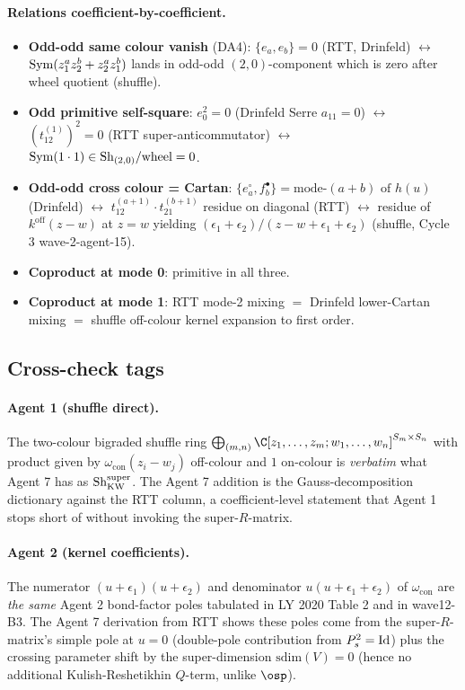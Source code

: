 \paragraph{Relations coefficient-by-coefficient.}
\begin{itemize}
  \item \textbf{Odd-odd same colour vanish} (DA4):
    $\{e_a, e_b\} = 0$ (RTT, Drinfeld) $\leftrightarrow$
    $\mathrm{Sym}(z_1^a z_2^b + z_2^a z_1^b)$ lands in odd-odd $(2,0)$-component
    which is zero after wheel quotient (shuffle).
  \item \textbf{Odd primitive self-square}:
    $e_0^2 = 0$ (Drinfeld Serre $a_{11}=0$) $\leftrightarrow$
    $(t^{(1)}_{12})^2 = 0$ (RTT super-anticommutator)
    $\leftrightarrow$ $\mathrm{Sym}(1\cdot 1) \in \mathrm{Sh}_{(2,0)}/\text{wheel} = 0$.
  \item \textbf{Odd-odd cross colour = Cartan}:
    $\{e_a^\circ, f_b^\bullet\} = \text{mode-}(a+b)\text{ of }h(u)$
    (Drinfeld) $\leftrightarrow$
    $t^{(a+1)}_{12}\cdot t^{(b+1)}_{21}$ residue on diagonal (RTT)
    $\leftrightarrow$ residue of $k^{\mathrm{off}}(z-w)$ at
    $z=w$ yielding $(\epsilon_1+\epsilon_2)/(z-w+\epsilon_1+\epsilon_2)$
    (shuffle, Cycle 3 wave-2-agent-15).
  \item \textbf{Coproduct at mode 0}: primitive in all three.
  \item \textbf{Coproduct at mode 1}: RTT mode-2 mixing
    $= $ Drinfeld lower-Cartan mixing $=$ shuffle off-colour
    kernel expansion to first order.
\end{itemize}

\subsection*{Cross-check tags}

\paragraph{Agent 1 (shuffle direct).} The two-colour bigraded shuffle
ring $\bigoplus_{(m,n)}\C[z_1,\ldots,z_m;w_1,\ldots,w_n]^{S_m\times S_n}$
with product given by $\omega_{\mathrm{con}}(z_i-w_j)$ off-colour and
$1$ on-colour is \emph{verbatim} what Agent 7 has as $\mathrm{Sh}^{\mathrm{super}}_{\mathrm{KW}}$.
The Agent 7 addition is the Gauss-decomposition dictionary against the
RTT column, a coefficient-level statement that Agent 1 stops short of
without invoking the super-$R$-matrix.

\paragraph{Agent 2 (kernel coefficients).} The numerator
$(u+\epsilon_1)(u+\epsilon_2)$ and denominator $u(u+\epsilon_1+\epsilon_2)$
of $\omega_{\mathrm{con}}$ are \emph{the same} Agent 2 bond-factor poles
tabulated in LY 2020 Table 2 and in wave12-B3. The Agent 7 derivation
from RTT shows these poles come from the super-$R$-matrix's simple
pole at $u=0$ (double-pole contribution from $P_s^2 = \mathrm{Id}$) plus the
crossing parameter shift by the super-dimension $\mathrm{sdim}(V) =
0$ (hence no additional Kulish-Reshetikhin $Q$-term, unlike $\osp$).

